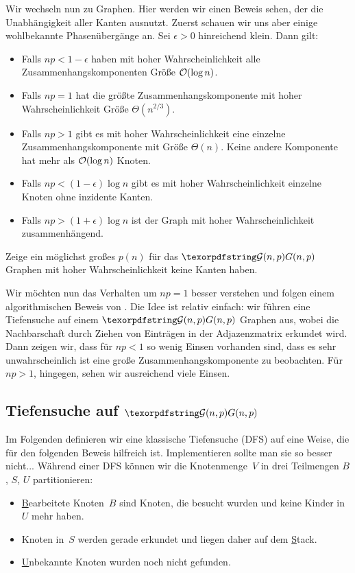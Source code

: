 Wir wechseln nun zu \Gnp Graphen.
Hier werden wir einen Beweis sehen, der die Unabhängigkeit aller Kanten ausnutzt.
Zuerst schauen wir uns aber einige wohlbekannte Phasenübergänge an.
Sei $\epsilon >0$ hinreichend klein.
Dann gilt:
\begin{itemize}
    \item Falls $np < 1 - \epsilon$ haben mit hoher Wahrscheinlichkeit alle Zusammenhangskomponenten Größe $\mathcal{O}\!\left(\log n\right)$.
    \item Falls $np = 1$ hat die größte Zusammenhangskomponente mit hoher Wahrscheinlichkeit Größe $\Theta(n^{2/3})$.
    \item Falls $np > 1$ gibt es mit hoher Wahrscheinlichkeit eine einzelne Zusammenhangskomponente mit Größe $\Theta(n)$.
          Keine andere Komponente hat mehr als $\mathcal{O}\!\left(\log n\right)$ Knoten.

    \item Falls $np < (1-\epsilon)\log n$ gibt es mit hoher Wahrscheinlichkeit einzelne Knoten ohne inzidente Kanten.
    \item Falls $np > (1+\epsilon)\log n$ ist der Graph mit hoher Wahrscheinlichkeit zusammenhängend.
\end{itemize}

\begin{exercise}
    Zeige ein möglichst großes $p(n)$ für das $\Gnp$ Graphen mit hoher Wahrscheinlichkeit keine Kanten haben.
\end{exercise}

Wir möchten nun das Verhalten um $np = 1$ besser verstehen und folgen einem algorithmischen Beweis von \cite{DBLP:journals/rsa/KrivelevichS13}.
Die Idee ist relativ einfach:
wir führen eine Tiefensuche auf einem $\Gnp$ Graphen aus, wobei die Nachbarschaft durch Ziehen von Einträgen in der Adjazenzmatrix erkundet wird.
Dann zeigen wir, dass für $np < 1$ so wenig Einsen vorhanden sind, dass es sehr unwahrscheinlich ist eine große Zusammenhangskomponente zu beobachten.
Für $np > 1$, hingegen, sehen wir ausreichend viele Einsen.

\subsection{Tiefensuche auf $\Gnp$}
Im Folgenden definieren wir eine klassische Tiefensuche (DFS) auf eine Weise, die für den folgenden Beweis hilfreich ist.
Implementieren sollte man sie so besser nicht...
Während einer DFS können wir die Knotenmenge~$V$ in drei Teilmengen $B$, $S$, $U$ partitionieren:
\begin{itemize}
    \item \underline Bearbeitete Knoten~$B$ sind Knoten, die besucht wurden und keine Kinder in $U$ mehr haben.
    \item Knoten in~$S$ werden gerade erkundet und liegen daher auf dem \underline Stack.
    \item \underline Unbekannte Knoten wurden noch nicht gefunden.
\end{itemize}

